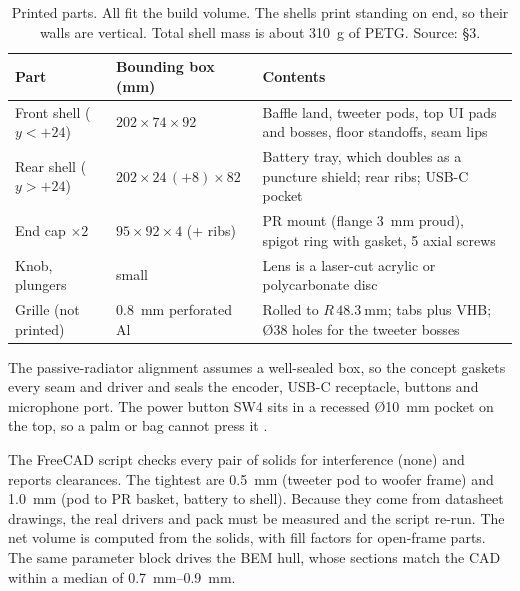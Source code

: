 \begin{table}[htbp]
\centering\small
\caption{Printed parts. All fit the  build volume. The shells print standing on end, so their walls are vertical. Total shell mass is about \qty{310}{\gram} of PETG. Source: \protect{} §3.}
\label{tab:parts}
\begin{tabularx}{\linewidth}{@{}l l >{\raggedright\arraybackslash}X@{}}
\toprule
Part & Bounding box (mm) & Contents \\
\midrule
Front shell ($y<+24$) & $202\times74\times92$ & Baffle land, tweeter pods, top UI pads and bosses, floor standoffs, seam lips \\
Rear shell ($y>+24$) & $202\times24\,(+8)\times82$ & Battery tray, which doubles as a puncture shield; rear ribs; USB-C pocket \\
End cap $\times2$ & $95\times92\times4$ (+ ribs) & PR mount (flange \qty{3}{\milli\metre} proud), spigot ring with gasket, 5 axial screws \\
Knob, plungers & small & Lens is a laser-cut acrylic or polycarbonate disc \\
Grille (not printed) & \qty{0.8}{\milli\metre} perforated Al & Rolled to $R\,\qty{48.3}{\milli\metre}$; tabs plus VHB; Ø38 holes for the tweeter bosses \\
\bottomrule
\end{tabularx}
\end{table}

The passive-radiator alignment assumes a well-sealed box, so the concept gaskets every seam and driver and seals the encoder, USB-C receptacle, buttons and microphone port. The power button SW4 sits in a recessed Ø\qty{10}{\milli\metre} pocket on the top, so a palm or bag cannot press it .

\begin{checked}
The FreeCAD script checks every pair of solids for interference (none) and reports clearances. The tightest are \qty{0.5}{\milli\metre} (tweeter pod to woofer frame) and \qty{1.0}{\milli\metre} (pod to PR basket, battery to shell). Because they come from datasheet drawings, the real drivers and pack must be measured and the script re-run. The net volume is computed from the solids, with fill factors for open-frame parts. The same parameter block drives the BEM hull, whose sections match the CAD within a median of \qtyrange{0.7}{0.9}{\milli\metre}.
\end{checked}

